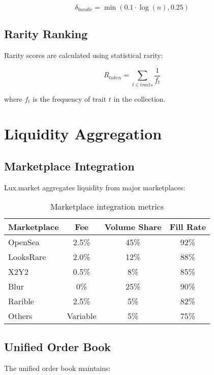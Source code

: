 \documentclass[11pt,a4paper]{article}
\begin{document}
\begin{equation}
\delta_{bundle} = \min(0.1 \cdot \log(n), 0.25)
\end{equation}

\subsection{Rarity Ranking}

Rarity scores are calculated using statistical rarity:

\begin{equation}
R_{token} = \sum_{t \in traits} \frac{1}{f_t}
\end{equation}

where $f_t$ is the frequency of trait $t$ in the collection.

\section{Liquidity Aggregation}

\subsection{Marketplace Integration}

Lux.market aggregates liquidity from major marketplaces:

\begin{table}[h]
\centering
\begin{tabular}{|l|c|c|c|}
\hline
\textbf{Marketplace} & \textbf{Fee} & \textbf{Volume Share} & \textbf{Fill Rate} \\
\hline
OpenSea & 2.5\% & 45\% & 92\% \\
LooksRare & 2.0\% & 12\% & 88\% \\
X2Y2 & 0.5\% & 8\% & 85\% \\
Blur & 0\% & 25\% & 90\% \\
Rarible & 2.5\% & 5\% & 82\% \\
Others & Variable & 5\% & 75\% \\
\hline
\end{tabular}
\caption{Marketplace integration metrics}
\end{table}

\subsection{Unified Order Book}

The unified order book maintains:
\end{document}

